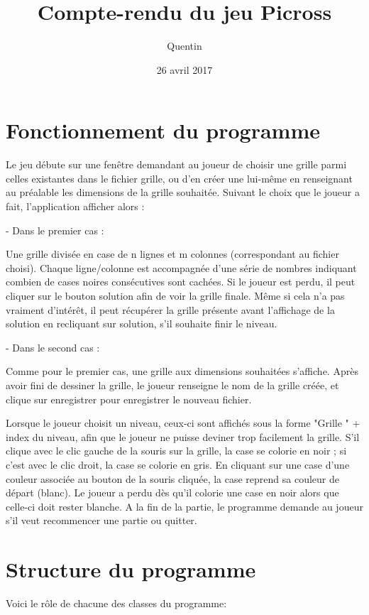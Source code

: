 \documentclass{report}
\title{Compte-rendu du jeu Picross}
\author{Quentin \bsc{SAUVAGE}}
\date{26 avril 2017}
\begin{document}
\maketitle
\chapter{Fonctionnement du programme}
Le jeu débute sur une fenêtre demandant au joueur de choisir une grille parmi celles existantes dans le fichier grille, ou d'en créer une lui-même en renseignant au préalable les dimensions de la grille souhaitée. Suivant le choix que le joueur a fait, l'application afficher alors :

- Dans le premier cas :

Une grille divisée en case de n lignes et m colonnes (correspondant au fichier choisi). Chaque ligne/colonne est accompagnée d'une série de nombres indiquant combien de cases noires consécutives sont cachées. Si le joueur est perdu, il peut cliquer sur le bouton solution afin de voir la grille finale. Même si cela n'a pas vraiment d'intérêt, il peut récupérer la grille présente avant l'affichage de la solution en recliquant sur solution, s'il souhaite finir le niveau.

- Dans le second cas :

Comme pour le premier cas, une grille aux dimensions souhaitées s'affiche. Après avoir fini de dessiner la grille, le joueur renseigne le nom de la grille créée, et clique sur enregistrer pour enregistrer le nouveau fichier.

Lorsque le joueur choisit un niveau, ceux-ci sont affichés sous la forme "Grille " + index du niveau, afin que le joueur ne puisse deviner trop facilement la grille. S'il clique avec le clic gauche de la souris sur la grille, la case se colorie en noir ; si c'est avec le clic droit, la case se colorie en gris. En cliquant sur une case d'une couleur associée au bouton de la souris cliquée, la case reprend sa couleur de départ (blanc). Le joueur a perdu dès qu'il colorie une case en noir alors que celle-ci doit rester blanche.
A la fin de la partie, le programme demande au joueur s'il veut recommencer une partie ou quitter. 

\chapter{Structure du programme}

Voici le rôle de chacune des classes du programme:
\end{document}
